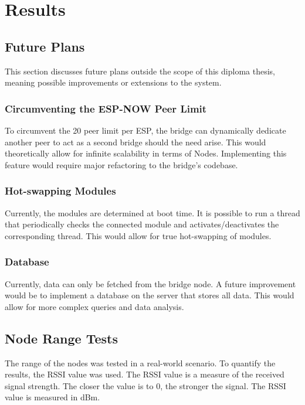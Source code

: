 \renewcommand*\chapterpagestyle{scrheadings}
\chapter{Results} 

\section{Future Plans}
This section discusses future plans outside the scope of this diploma thesis,
meaning possible improvements or extensions to the system.

    \subsection{Circumventing the ESP-NOW Peer Limit}
    To circumvent the 20 peer limit per ESP, the bridge can dynamically
    dedicate another peer to act as a second bridge should the
    need arise. This would theoretically allow for infinite scalability in terms
    of Nodes. Implementing this feature would require major refactoring to the
    bridge's codebase.

    \subsection{Hot-swapping Modules}
    Currently, the modules are determined at boot time. It is possible to run
    a thread that periodically checks the connected module and activates/deactivates 
    the corresponding thread. This would allow for true hot-swapping of modules.

    \subsection{Database}
    Currently, data can only be fetched from the bridge node.
    A future improvement would be to implement a database on the
    server that stores all data. This would allow for more 
    complex queries and data analysis.

\section{Node Range Tests}
The range of the nodes was tested in a real-world scenario.
To quantify the results, the RSSI value was used. The RSSI value
is a measure of the received signal strength. The closer the value is to 0,
the stronger the signal. The RSSI value is measured in dBm.

